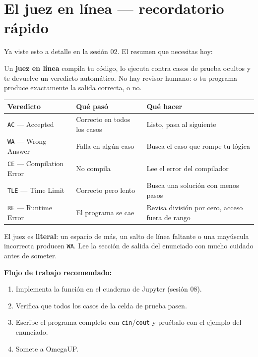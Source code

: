 \documentclass[12pt, oneside]{article}
\begin{document}

\tableofcontents
\newpage

\section{El juez en línea — recordatorio rápido}

Ya viste esto a detalle en la sesión 02.  El resumen que necesitas hoy:

Un \textbf{juez en línea} compila tu código, lo ejecuta contra casos de prueba
ocultos y te devuelve un veredicto automático.  No hay revisor humano: o tu
programa produce exactamente la salida correcta, o no.

\begin{center}
\begin{tabular}{llp{6cm}}
  \toprule
  \textbf{Veredicto} & \textbf{Qué pasó} & \textbf{Qué hacer} \\
  \midrule
  \texttt{AC} — Accepted           & Correcto en todos los casos   & Listo, pasa al siguiente \\[3pt]
  \texttt{WA} — Wrong Answer       & Falla en algún caso           & Busca el caso que rompe tu lógica \\[3pt]
  \texttt{CE} — Compilation Error  & No compila                    & Lee el error del compilador \\[3pt]
  \texttt{TLE} — Time Limit        & Correcto pero lento           & Busca una solución con menos pasos \\[3pt]
  \texttt{RE} — Runtime Error      & El programa se cae            & Revisa división por cero, acceso fuera de rango \\
  \bottomrule
\end{tabular}
\end{center}

\begin{advertencia}
  El juez es \textbf{literal}: un espacio de más, un salto de línea faltante o
  una mayúscula incorrecta producen \texttt{WA}.  Lee la sección de salida del
  enunciado con mucho cuidado antes de someter.
\end{advertencia}

\begin{consejo}
  \textbf{Flujo de trabajo recomendado:}
  \begin{enumerate}
    \item Implementa la función en el cuaderno de Jupyter (sesión 08).
    \item Verifica que todos los casos de la celda de prueba pasen.
    \item Escribe el programa completo con \texttt{cin}/\texttt{cout} y pruébalo
          con el ejemplo del enunciado.
    \item Somete a OmegaUP.
  \end{enumerate}
\end{consejo}
\end{document}
